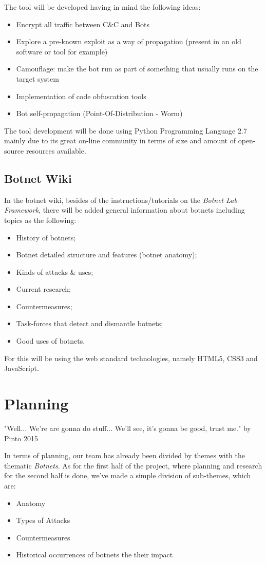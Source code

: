 \documentclass[]{article}
\begin{document}
The tool will be developed having in mind the following ideas:
\begin{itemize}
	\item Encrypt all traffic between C\&C and Bots
	\item Explore a pre-known exploit as a way of propagation (present in an old software or tool for example)
	\item Camouflage: make the bot run as part of something that usually runs on the target system
	\item Implementation of code obfuscation tools
	\item Bot self-propagation (Point-Of-Distribution - Worm)
\end{itemize}

The tool development will be done using Python Programming Language 2.7 \cite{app:python} mainly due to its great  on-line community in terms of size and amount of open-source resources available.

\subsection{Botnet Wiki}

In the botnet wiki, besides of the instructions/tutorials on the \textit{Botnet Lab Framework}, there will be added general information about botnets including topics as the following:
\begin{itemize}
	\item History of botnets;
	\item Botnet detailed structure and features (botnet anatomy);
	\item Kinds of attacks \& uses;
	\item Current research;
	\item Countermeasures;
	\item Task-forces that detect and dismantle botnets;
	\item Good uses of botnets.
\end{itemize}

For this will be using the web standard technologies, namely HTML5, CSS3 and JavaScript.

\section{Planning}
"Well... We're are gonna do stuff... We'll see, it's gonna be good, trust me." by Pinto 2015

In terms of planning, our team has already been divided by themes with the thematic \textit{Botnets}. As for the first half of the project, where planning and research for the second half is done, we've made a simple division of sub-themes, which are:
\begin{itemize}
\item Anatomy
\item Types of Attacks
\item Countermeasures
\item Historical occurrences of botnets the their impact
\end{itemize} 
\end{document}
